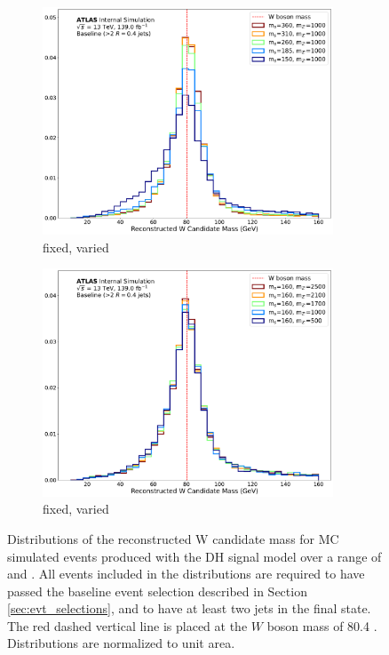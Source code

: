 \begin{figure}[h]
	\centering
	\begin{subfigure}[b]{0.49\textwidth}
	\includegraphics[width=0.95\textwidth]{Figures/5/WCand_m_ms.pdf}
	\caption{\mZp fixed, \ms varied}
	\label{fig:resolved_Wmass_reco_ms}
	\end{subfigure}
	\begin{subfigure}[b]{0.49\textwidth}
	\includegraphics[width=0.95\textwidth]{Figures/5/WCand_m_mZp.pdf}
	\caption{\ms fixed, \mZp varied}
	\label{fig:resolved_Wmass_reco_mZp}
	\end{subfigure}
	\caption[]{Distributions of the reconstructed W candidate mass for MC simulated events produced with the DH signal model over a range of \ms and \mZp. All events included in the distributions are required to have passed the baseline event selection described in Section \ref{sec:evt_selections}, and to have at least two \smallR jets in the final state. The red dashed vertical line is placed at the \(W\) boson mass of 80.4 \GeV. Distributions are normalized to unit area.}
	\label{fig:resolved_Wmass_reco}
\end{figure}

